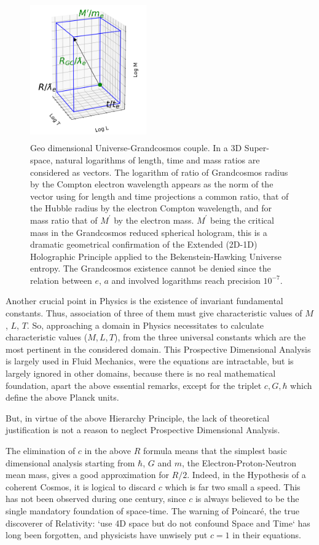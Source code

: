\documentclass[twoside,draft]{article}
\begin{document}
\begin{sloppypar}
{\begin{figure}[h]
\centering
\includegraphics[width=5cm,height=6cm]{./figures/triaxis.png}
\caption{Geo dimensional Universe-Grandcosmos couple. In a 3D Super-space, natural logarithms of length, time and mass ratios are considered as vectors. The logarithm of ratio of Grandcosmos radius by the Compton electron wavelength appears as the norm of the vector using for length and time projections a common ratio, that of the Hubble radius by the electron Compton wavelength, and for mass ratio that of $M^{\prime}$ by the electron mass. $M^{\prime}$ being the critical mass in the Grandcosmos reduced spherical hologram, this is a dramatic geometrical confirmation of the Extended (2D-1D) Holographic Principle applied to the Bekenstein-Hawking Universe entropy. The Grandcosmos existence cannot be denied since the relation between $e$, $a$ and involved logarithms reach precision $10^{-7}$.} 
\end{figure}

Another crucial point in Physics is the existence of invariant fundamental constants. Thus,
association of three of them must give characteristic values of $M$, $L$, $T$. So, approaching a domain in
Physics necessitates to calculate characteristic values ($M, L, T$), from the three universal constants
which are the most pertinent in the considered domain. This Prospective Dimensional Analysis is
largely used in Fluid Mechanics, were the equations are intractable, but is largely ignored in other
domains, because there is no real mathematical foundation, apart the above essential remarks, except for the triplet $c, G, \hbar$ which define the above Planck units. 

But, in virtue of the above Hierarchy Principle, the lack of theoretical justification is not a reason to
neglect Prospective Dimensional Analysis. 

The elimination of $c$ in the above $R$ formula means that the simplest basic dimensional
analysis starting from $\hbar$, $G$ and $m$, the Electron-Proton-Neutron mean mass, gives a good
approximation for $R/2$. Indeed, in the Hypothesis of a coherent Cosmos, it is logical to discard $c$
which is far two small a speed. This has not been observed during one century, since $c$ is always
believed to be the single mandatory foundation of space-time. The warning of Poincar\'{e}, the true
discoverer of Relativity: `use 4D space but do not confound Space and Time` has long been
forgotten, and physicists have unwisely put $c = 1$ in their equations.

}
\end{sloppypar}
\end{document}
